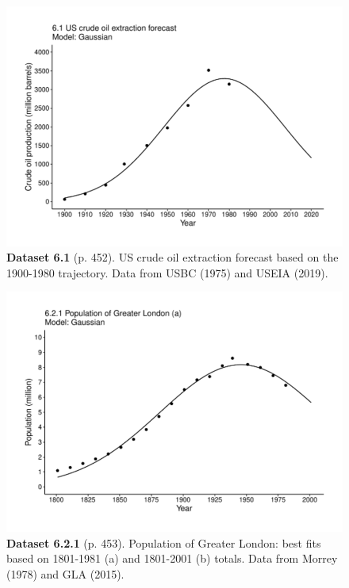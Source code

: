 \documentclass[aps,rmp,preprint,superscriptaddress,10pt,onecolumn]{article}
\begin{document}
\clearpage
\begin{figure}[h]
\includegraphics[width=\textwidth]{output/figs-ggplot/6.1.pdf}
\caption*{\textbf{Dataset 6.1} (p. 452). US crude oil extraction forecast based on the 1900-1980 trajectory. Data from USBC (1975) and USEIA (2019). }
\end{figure}
	
\clearpage
\begin{figure}[h]
\includegraphics[width=\textwidth]{output/figs-ggplot/6.2.1.pdf}
\caption*{\textbf{Dataset 6.2.1} (p. 453). Population of Greater London: best fits based on 1801-1981 (a) and 1801-2001 (b) totals. Data from Morrey (1978) and GLA (2015). }
\end{figure}
	
\end{document}
